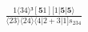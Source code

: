 \documentclass[varwidth, border=5pt]{standalone}
\begin{document}
\begin{my}
$\begin{gathered}
\scriptscriptstyle\frac{1⟨34⟩³[𝟓1][1|𝟓|𝟓⟩}{⟨23⟩⟨24⟩⟨4|2+3|1]s_{234}}
\end{gathered}$
\end{my}
\end{document}
